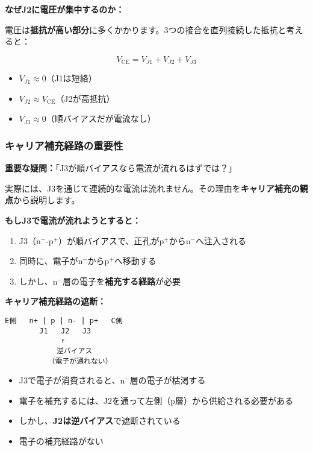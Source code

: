 \textbf{なぜJ2に電圧が集中するのか：}

電圧は\textbf{抵抗が高い部分}に多くかかります。3つの接合を直列接続した抵抗と考えると：

\begin{equation}
V_{\text{CE}} = V_{J1} + V_{J2} + V_{J3}
\end{equation}

\begin{itemize}
\item $V_{J1} \approx 0$（J1は短絡）
\item $V_{J2} \approx V_{\text{CE}}$（J2が高抵抗）
\item $V_{J3} \approx 0$（順バイアスだが電流なし）
\end{itemize}

\subsubsection{キャリア補充経路の重要性}

\textbf{重要な疑問：}「J3が順バイアスなら電流が流れるはずでは？」

実際には、J3を通じて連続的な電流は流れません。その理由を\textbf{キャリア補充の観点}から説明します。

\textbf{もしJ3で電流が流れようとすると：}

\begin{enumerate}
\item J3（n$^-$-p$^+$）が順バイアスで、正孔がp$^+$からn$^-$へ注入される
\item 同時に、電子がn$^-$からp$^+$へ移動する
\item しかし、n$^-$層の電子を\textbf{補充する経路}が必要
\end{enumerate}

\textbf{キャリア補充経路の遮断：}

\begin{verbatim}
E側   n+ | p | n- | p+   C側
        J1   J2   J3
             ↑
            逆バイアス
          （電子が通れない）
\end{verbatim}

\begin{itemize}
\item J3で電子が消費されると、n$^-$層の電子が枯渇する
\item 電子を補充するには、J2を通って左側（p層）から供給される必要がある
\item しかし、\textbf{J2は逆バイアス}で遮断されている
\item 電子の補充経路がない
\end{itemize}

